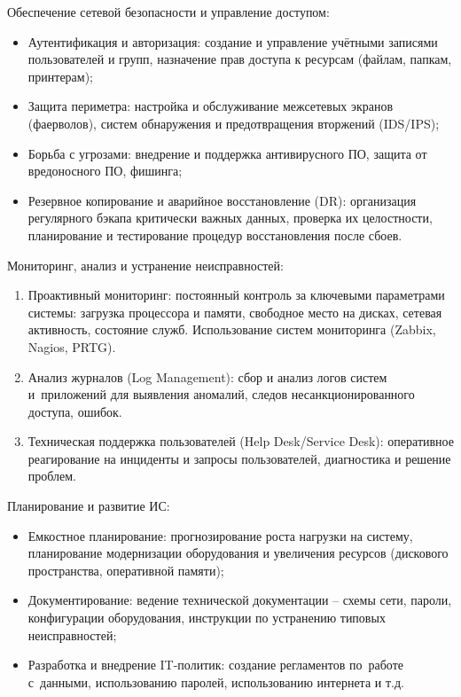 \documentclass{ou}
\begin{document}
Обеспечение сетевой безопасности и управление доступом:
\begin{itemize}[label=-, leftmargin=0em, itemindent=3.35em, nosep]
\item Аутентификация и авторизация: создание и управление учётными записями пользователей и групп, назначение прав доступа к ресурсам (файлам, папкам, принтерам);
\item Защита периметра: настройка и обслуживание межсетевых экранов (фаерволов), систем обнаружения и предотвращения вторжений (IDS/IPS);
\item Борьба с угрозами: внедрение и поддержка антивирусного ПО, защита от вредоносного ПО, фишинга;
\item Резервное копирование и аварийное восстановление (DR): организация регулярного бэкапа критически важных данных, проверка их целостности, планирование и тестирование процедур восстановления после сбоев.
\end{itemize}

Мониторинг, анализ и устранение неисправностей:
\begin{enumerate}[leftmargin=0em, itemindent=3.75em, nosep, label=\arabic*)]
\item Проактивный мониторинг: постоянный контроль за ключевыми параметрами системы: загрузка процессора и памяти, свободное место на дисках, сетевая активность, состояние служб. Использование систем мониторинга (Zabbix, Nagios, PRTG).
\item Анализ журналов (Log Management): сбор и анализ логов систем и~приложений для выявления аномалий, следов несанкционированного доступа, ошибок.
\item Техническая поддержка пользователей (Help Desk/Service Desk): оперативное реагирование на инциденты и запросы пользователей, диагностика и решение проблем.
\end{enumerate}

Планирование и развитие ИС:
\begin{itemize}[label=-, leftmargin=0em, itemindent=3.35em, nosep]
\item Емкостное планирование: прогнозирование роста нагрузки на систему, планирование модернизации оборудования и увеличения ресурсов (дискового пространства, оперативной памяти);
\item Документирование: ведение технической документации -- схемы сети, пароли, конфигурации оборудования, инструкции по устранению типовых неисправностей;
\item Разработка и внедрение IT-политик: создание регламентов по~работе с~данными, использованию паролей, использованию интернета и т.д.
\end{itemize}
\end{document}
